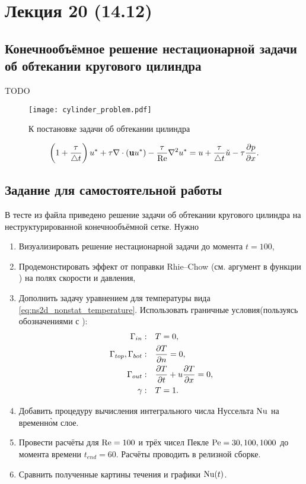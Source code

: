 \section{Лекция 20 (14.12)}

\subsection{Конечнообъёмное решение нестационарной задачи об обтекании кругового цилиндра}
TODO
\begin{figure}[h!]
\centering
\texttt{[image: cylinder\_problem.pdf]}
\caption{К постановке задачи об обтекании цилиндра}
\label{fig:cylinder-problem}

\end{figure}
\begin{equation}
\label{eq:ustar_fvm}
\left(1 + \frac{\tau}{\triangle t}\right) u^* + \tau \nabla\cdot(\boldsymbol{\rm u} u^*) - \frac{\tau}{\mathrm{Re}}\nabla^2 u^* = u + \frac{\tau}{\triangle t} \check u - \tau \frac{\partial p}{\partial x}.
\end{equation}


\subsection{Задание для самостоятельной работы}
В тесте  из файла 
приведено решение задачи об обтекании кругового цилиндра на неструктурированной конечнообъёмной сетке.
Нужно
\begin{enumerate}
\item
Визуализировать решение нестационарной задачи до момента $t = 100$,
\item
Продемонстировать эффект от поправки Rhie--Chow (см. аргумент  в функции )
на полях скорости и давления,
\item
Дополнить задачу уравнением для температуры вида \cref{eq:ns2d_nonstat_temperature}.
Использовать граничные условия(пользуясь обозначениями с ):
\begin{equation*}
\begin{aligned}
\Gamma_{in}:                &\quad T = 0,\\
\Gamma_{top}, \Gamma_{bot}: &\quad \frac{\partial T}{\partial n} = 0, \\
\Gamma_{out}:               &\quad \frac{\partial T}{\partial t} + u\frac{\partial T}{\partial x} = 0,\\
\gamma:                     &\quad T = 1. \\
\end{aligned}
\end{equation*}
\item
Добавить процедуру вычисления интегрального числа Нуссельта $\mathrm{Nu}$ на временн\`{о}м слое.
\item
Провести расчёты для $\mathrm{Re}=100$ и трёх чисел Пекле $\mathrm{Pe} = 30, 100, 1000$ до момента времени $t_{end} = 60$. Расчёты
проводить в релизной сборке.
\item
Сравнить полученные картины течения и графики $\mathrm{Nu}(t)$.
\end{enumerate}


